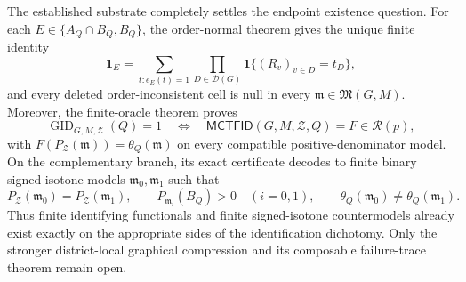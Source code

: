 The established substrate completely settles the endpoint existence question. For each \(E\in\{A_Q\cap B_Q,B_Q\}\), the order-normal theorem gives the unique finite identity
\[
 \mathbf 1_E
 =\sum_{t:e_E(t)=1}
  \prod_{D\in\mathcal D(G)}
  \mathbf 1\{(R_v)_{v\in D}=t_D\},
\]
and every deleted order-inconsistent cell is null in every \(\mathfrak m\in\mathfrak M(G,M)\). Moreover, the finite-oracle theorem proves
\[
 \operatorname{GID}_{G,M,\mathcal Z}(Q)=1
 \quad\Longleftrightarrow\quad
 \mathsf{MCTFID}(G,M,\mathcal Z,Q)=F\in\mathcal R(p),
\]
with \(F(P_{\mathcal Z}(\mathfrak m))=\theta_Q(\mathfrak m)\) on every compatible positive-denominator model. On the complementary branch, its exact certificate decodes to finite binary signed-isotone models \(\mathfrak m_0,\mathfrak m_1\) such that
\[
 P_{\mathcal Z}(\mathfrak m_0)=P_{\mathcal Z}(\mathfrak m_1),
 \qquad
 P_{\mathfrak m_i}(B_Q)>0\quad(i=0,1),
 \qquad
 \theta_Q(\mathfrak m_0)\ne\theta_Q(\mathfrak m_1).
\]
Thus finite identifying functionals and finite signed-isotone countermodels already exist exactly on the appropriate sides of the identification dichotomy. Only the stronger district-local graphical compression and its composable failure-trace theorem remain open.